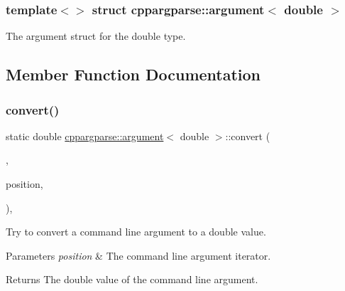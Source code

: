\subsubsection*{template$<$$>$\newline
struct cppargparse\+::argument$<$ double $>$}

The argument struct for the double type. 

\subsection{Member Function Documentation}
\mbox{\label{structcppargparse_1_1argument_3_01double_01_4_a19756d869b671553629d509f18549903}} 
\subsubsection{\texorpdfstring{convert()}{convert()}}
{\footnotesize\ttfamily static double \hyperlink{structcppargparse_1_1argument}{cppargparse\+::argument}$<$ double $>$\+::convert (\begin{DoxyParamCaption}\item[{const \hyperlink{types_8h_a80adf2418b7ce9fe616698efa7533ecf}{types\+::\+Command\+Line\+\_\+t} \&}]{,  }\item[{const \hyperlink{types_8h_a43b4f43f8940de1bf09ced6f1b668053}{types\+::\+Command\+Line\+Position\+\_\+t} \&}]{position,  }\item[{const \hyperlink{types_8h_a003c660afe2ee9c6cc39aea966e8926d}{types\+::\+Command\+Line\+Arguments\+\_\+t} \&}]{ }\end{DoxyParamCaption})\hspace{0.3cm}{\ttfamily [inline]}, {\ttfamily [static]}}



Try to convert a command line argument to a double value. 


\begin{DoxyParams}{Parameters}
{\em position} & The command line argument iterator.\\
\hline
\end{DoxyParams}
\begin{DoxyReturn}{Returns}
The double value of the command line argument. 
\end{DoxyReturn}
\mbox{\label{structcppargparse_1_1argument_3_01double_01_4_aa587b4a64888fd195328d2491f893bc5}} 
